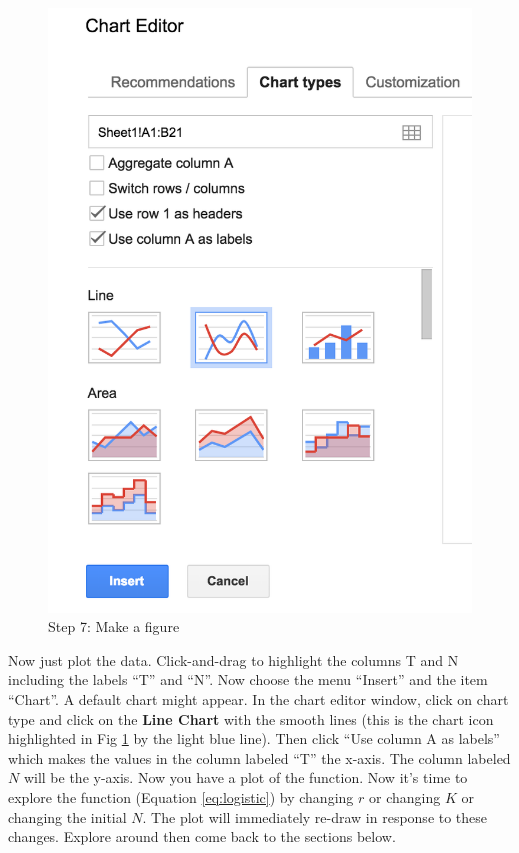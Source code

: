 \documentclass[]{book}
\begin{document}
\begin{figure}

{\centering \includegraphics[width=0.8\linewidth]{images/logistic7} 

}

\caption{Step 7: Make a figure}\label{fig:cancer-fig7}
\end{figure}

Now just plot the data. Click-and-drag to highlight the columns T and N
including the labels ``T'' and ``N''. Now choose the menu ``Insert'' and
the item ``Chart''. A default chart might appear. In the chart editor
window, click on chart type and click on the \textbf{Line Chart} with
the smooth lines (this is the chart icon highlighted in Fig
\ref{fig:cancer-fig7} by the light blue line). Then click ``Use column A
as labels'' which makes the values in the column labeled ``T'' the
x-axis. The column labeled \(N\) will be the y-axis. Now you have a plot
of the function. Now it's time to explore the function (Equation
\eqref{eq:logistic}) by changing \(r\) or changing \(K\) or changing the
initial \(N\). The plot will immediately re-draw in response to these
changes. Explore around then come back to the sections below.
\end{document}
